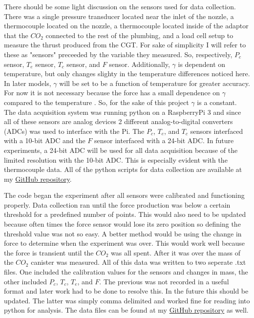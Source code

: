 \begin{tcolorbox}[breakable,title=Data Sensors, height fixed for=first and middle]
There should be some light discussion on the sensors used for data collection. There was a single pressure transducer located near the inlet of the nozzle, a thermocouple located on the nozzle, a thermocouple located inside of the adaptor that the $CO_2$ connected to the rest of the plumbing, and a load cell setup to measure the thrust produced from the CGT. For sake of simplicity I will refer to these as "sensors" preceeded by the variable they measured. So, respectively, $P_c$ sensor, $T_e$ sensor, $T_c$ sensor, and $F$ sensor. Additionally, $\gamma$ is dependent on temperature, but only changes slighty in the temperature differences noticed here. In later models, $\gamma$ will be set to be a function of temperature for greater accuracy. For now it is not necessary because the force has a small dependence on $\gamma$ compared to the temperature . So, for the sake of this project $\gamma$ is a constant. The data acquisition system was running python on a RaspberryPi 3 and since all of these sensors are analog devices 2 different analog-to-digital converters (ADCs) was used to interface with the Pi. The $P_c$, $T_e$, and $T_c$ sensors interfaced with a 10-bit ADC and the $F$ sensor interfaced with a 24-bit ADC. In future experiments, a 24-bit ADC will be used for all data acquisition because of the limited resolution with the 10-bit ADC. This is especially evident with the thermocouple data. All of the python scripts for data collection are available at my \href{https://github.com/maxmhuggins/RCS_HAB/tree/master/On_Ground_Testing/Code}{GitHub repository}.
\end{tcolorbox}
The code began the experiment after all sensors were calibrated and functioning properly. Data collection ran until the force production was below a certain threshold for a predefined number of points. This would also need to be updated because often times the force sensor would lose its zero position so defining the threshold value was not so easy. A better method would be using the change in force to determine when the experiment was over. This would work well because the force is transient until the $CO_2$ was all spent. After it was over the mass of the $CO_2$ canister was measured. All of this data was written to two seperate .txt files. One included the calibration values for the sensors and changes in mass, the other included $P_c$, $T_c$, $T_e$, and $F$. The previous was not recorded in a useful format and later work had to be done to resolve this. In the future this should be updated. The latter was simply comma delimited and worked fine for reading into python for analysis. The data files can be found at my \href{https://github.com/maxmhuggins/RCS_HAB/tree/master/On_Ground_Testing/Data_and_Analysis/Experimental_Data_Analysis/Refined_Data_Files}{GitHub repository} as well.

